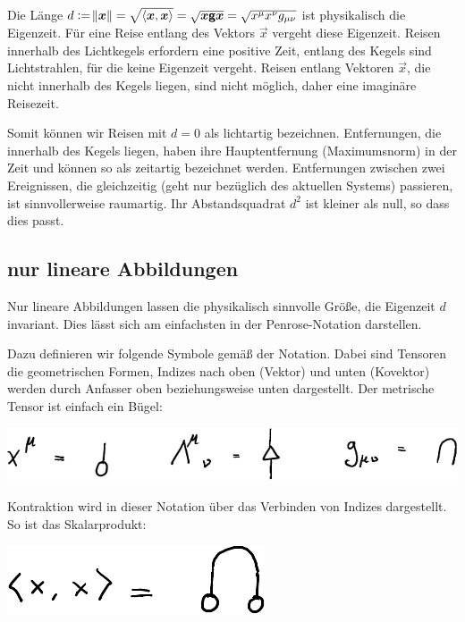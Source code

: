 Die Länge $d := \norm{\boldsymbol{x}} = \sqrt{\left\langle \boldsymbol{x}, \boldsymbol{x} \right\rangle} = \sqrt{\boldsymbol{x}
\boldsymbol{\mathsf{g}} \boldsymbol{x}} = \sqrt{x^\mu x^\nu g_{\mu \nu}}$ ist physikalisch die
Eigenzeit. Für eine Reise entlang des Vektors $\vec x$ vergeht diese Eigenzeit.
Reisen innerhalb des Lichtkegels erfordern eine positive Zeit, entlang des
Kegels sind Lichtstrahlen, für die keine Eigenzeit vergeht. Reisen entlang
Vektoren $\vec x$, die nicht innerhalb des Kegels liegen, sind nicht möglich,
daher eine imaginäre Reisezeit.

Somit können wir Reisen mit $d = 0$ als lichtartig bezeichnen. Entfernungen,
die innerhalb des Kegels liegen, haben ihre Hauptentfernung (Maximumsnorm) in
der Zeit und können so als zeitartig bezeichnet werden. Entfernungen zwischen
zwei Ereignissen, die gleichzeitig (geht nur bezüglich des aktuellen Systems)
passieren, ist sinnvollerweise raumartig. Ihr Abstandsquadrat $d^2$ ist kleiner
als null, so dass dies passt.

\subsection{nur lineare Abbildungen}

Nur lineare Abbildungen lassen die physikalisch sinnvolle Größe, die Eigenzeit
$d$ invariant. Dies lässt sich am einfachsten in der Penrose-Notation
darstellen.

Dazu definieren wir folgende Symbole gemäß der Notation. Dabei sind Tensoren
die geometrischen Formen, Indizes nach oben (Vektor) und unten (Kovektor)
werden durch Anfasser oben beziehungsweise unten dargestellt. Der metrische
Tensor ist einfach ein Bügel:
\begin{center}
	\includegraphics{H1-Definitionen.pdf}
\end{center}

Kontraktion wird in dieser Notation über das Verbinden von Indizes dargestellt.
So ist das Skalarprodukt:
\begin{center}
	\includegraphics{H1-Skalarprodukt.pdf}
\end{center}

